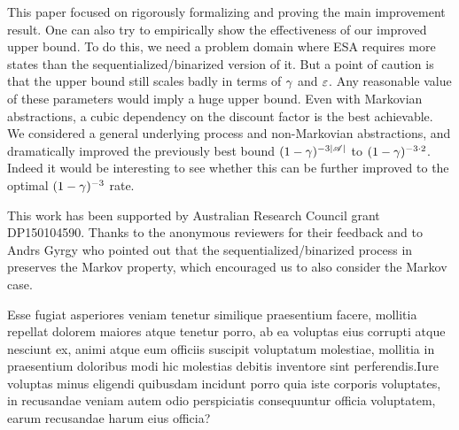 \documentclass{article} %
\renewcommand{\bibstylename}{aaai21} %
\renewcommand{\bibstylename}{apalike}
\renewcommand{\bibstylename}{unsrtnat}
\begin{document}
This paper focused on rigorously formalizing and proving the main improvement result. One can also try to empirically show the effectiveness of our improved upper bound. To do this, we need a problem domain where ESA requires more states than the sequentialized/binarized version of it. But a point of caution is that the upper bound still scales badly in terms of $\gamma$ and $\varepsilon$. Any reasonable value of these parameters would imply a huge upper bound.
Even with Markovian abstractions, a cubic dependency on the discount factor is the best achievable.
We considered a general underlying process and non-Markovian abstractions,
and dramatically improved the previously best bound $(1-\gamma)^{-3|\mathscr{A}|}$ to $(1-\gamma)^{-3\cdot 2}$.
Indeed it would be interesting to see whether this can be further improved to the optimal $(1-\gamma)^{-3}$ rate.

This work has been supported by Australian Research Council grant  DP150104590. Thanks to the anonymous reviewers for their feedback and to Andrs Gyrgy who pointed out that the sequentialized/binarized process in  preserves the Markov property, which encouraged us to also consider the Markov case.

\begin{small}
    
    Esse fugiat asperiores veniam tenetur similique praesentium facere, mollitia repellat dolorem maiores atque tenetur porro, ab ea voluptas eius corrupti atque nesciunt ex, animi atque eum officiis suscipit voluptatum molestiae, mollitia in praesentium doloribus modi hic molestias debitis inventore sint perferendis.Iure voluptas minus eligendi quibusdam incidunt porro quia iste corporis voluptates, in recusandae veniam autem odio perspiciatis consequuntur officia voluptatem, earum recusandae harum eius officia?\clearpage

\end{small}
\end{document}

